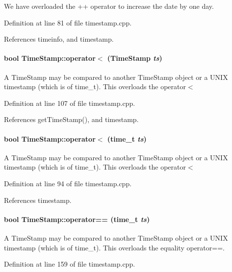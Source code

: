 We have overloaded the ++ operator to increase the date by one day. 

Definition at line 81 of file timestamp.cpp.

References timeinfo, and timestamp.\hypertarget{classTimeStamp_TimeStampa9}{
\paragraph[operator$<$]{\setlength{\rightskip}{0pt plus 5cm}bool Time\-Stamp::operator$<$ (Time\-Stamp {\em ts})}\hfill}
\label{classTimeStamp_TimeStampa9}


A Time\-Stamp may be compared to another Time\-Stamp object or a UNIX timestamp (which is of time\_\-t). This overloads the operator$<$ 

Definition at line 107 of file timestamp.cpp.

References get\-Time\-Stamp(), and timestamp.\hypertarget{classTimeStamp_TimeStampa8}{
\paragraph[operator$<$]{\setlength{\rightskip}{0pt plus 5cm}bool Time\-Stamp::operator$<$ (time\_\-t {\em ts})}\hfill}
\label{classTimeStamp_TimeStampa8}


A Time\-Stamp may be compared to another Time\-Stamp object or a UNIX timestamp (which is of time\_\-t). This overloads the operator$<$ 

Definition at line 94 of file timestamp.cpp.

References timestamp.\hypertarget{classTimeStamp_TimeStampa11}{
\paragraph[operator==]{\setlength{\rightskip}{0pt plus 5cm}bool Time\-Stamp::operator== (time\_\-t {\em ts})}\hfill}
\label{classTimeStamp_TimeStampa11}


A Time\-Stamp may be compared to another Time\-Stamp object or a UNIX timestamp (which is of time\_\-t). This overloads the equality operator==. 

Definition at line 159 of file timestamp.cpp.

